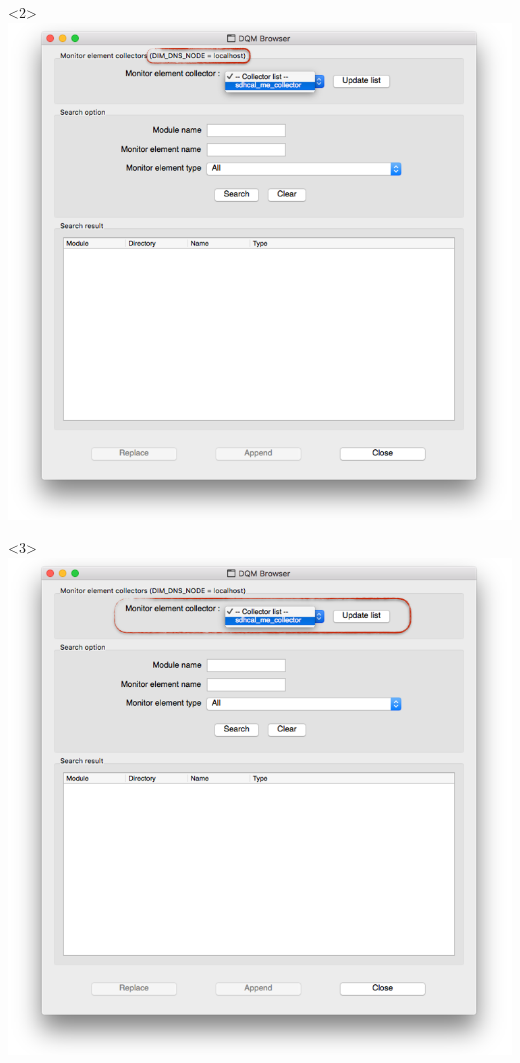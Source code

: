 \documentclass[8pt]{beamer}
\begin{document}
\begin{frame}
\begin{overlayarea}{\textwidth}{\textheight}
\begin{columns}
	\begin{center}
         \begin{onlyenv}<2>\includegraphics[width=1.1\textwidth]{figs/Browser/Browser_DNSNode.png}\end{onlyenv}
         \begin{onlyenv}<3>\includegraphics[width=1.1\textwidth]{figs/Browser/Browser_MESelection}\end{onlyenv}

\end{center}
\end{columns}
\end{overlayarea}
\end{frame}
\end{document}
